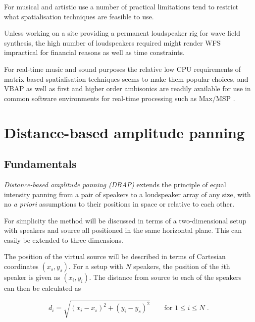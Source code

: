 \documentclass[twoside,10pt]{article}
\begin{document}
For musical and artistic use a number of practical limitations tend to restrict what spatialisation techniques are feasible to use.

Unless working on a site providing a permanent loudspeaker rig for wave field synthesis, the high number of loudspeakers required might render WFS impractical for financial reasons as well as time constraints.

For real-time music and sound purposes the relative low CPU requirements of matrix-based spatialisation techniques seems to make them popular choices, and VBAP as well as first and higher order ambisonics are readily available for use in common software environments for real-time processing such as Max/MSP \cite{Pulkki:2000vbap_max, Schacher:2006ambi_max, Neukom:2008ambipan}.


%
%

\section{Distance-based amplitude panning}

\subsection{Fundamentals}

\textit{Distance-based amplitude panning (DBAP)} extends the principle of equal intensity panning from a pair of speakers to a loudspeaker array of any size, with no \textit{a priori} assumptions to their positions in space or relative to each other.

For simplicity the method will be discussed in terms of a two-dimensional setup with speakers and source all positioned in the same horizontal plane. This can easily be extended to three dimensions.

The position of the virtual source will be described in terms of Cartesian coordinates $(x_{s}, y_{s})$. For a setup with $N$ speakers, the position of the $i$th speaker is given as $(x_{i}, y_{i})$. The distance from source to each of the speakers can then be calculated as

\begin{equation} \label{eq:distance}
d_{i} = \sqrt{ {(x_{i} - x_{s})}^2 + {(y_{i} - y_{s})}^2 } \qquad \textrm{for } 1 \leq i \leq N \textrm{ .}
\end{equation}
\end{document}

